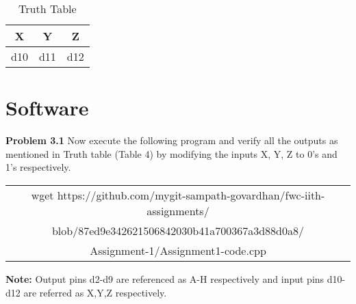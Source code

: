 \documentclass[journal,12pt,twocolumn]{IEEEtran}
\begin{document}
    \begin{table}[h]
    \centering
    \begin{tabular}{| c | c | c |}
    \hline
    \textbf{X} & \textbf{Y} & \textbf{Z} \\
    \hline
    d10 & d11 & d12  \\
    \hline
    \end{tabular}
    \caption{Truth Table}
    \label{tab:my_label}
 \end{table}


\section{Software}

\textbf{Problem 3.1} Now execute the following program and verify all the outputs as mentioned in Truth table (Table 4) by modifying the inputs X, Y, Z to 0's and 1's respectively. \\
\begin{table}[h]
    \centering
    \begin{tabular}{| c |}
    \hline
    wget https://github.com/mygit-sampath-govardhan/fwc-iith-assignments/\\blob/87ed9e342621506842030b41a700367a3d88d0a8/\\Assignment-1/Assignment1-code.cpp\\
    \hline
    \end{tabular}
\end{table}

\textbf{Note:} Output pins d2-d9 are referenced as A-H respectively and input pins d10-d12 are referred as X,Y,Z respectively.\\
\end{document}
